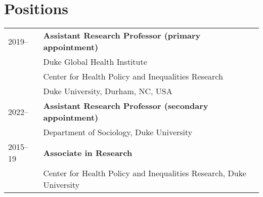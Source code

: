 \vspace{3ex}
\section*{Positions}
\begin{longtable}{p{} p{}}
2019-- & \textbf{Assistant Research Professor (primary appointment)}\\
		             & Duke Global Health Institute\\
		             & Center for Health Policy and Inequalities Research\\
		             &Duke University, Durham, NC, USA \\
		             
		             2022-- & \textbf{Assistant Research Professor (secondary appointment)}\\
		             & Department of Sociology, Duke University \\
		             
2015--19 & \textbf{Associate in Research}\\
& Center for Health Policy and Inequalities Research, Duke University\\
\end{longtable}
